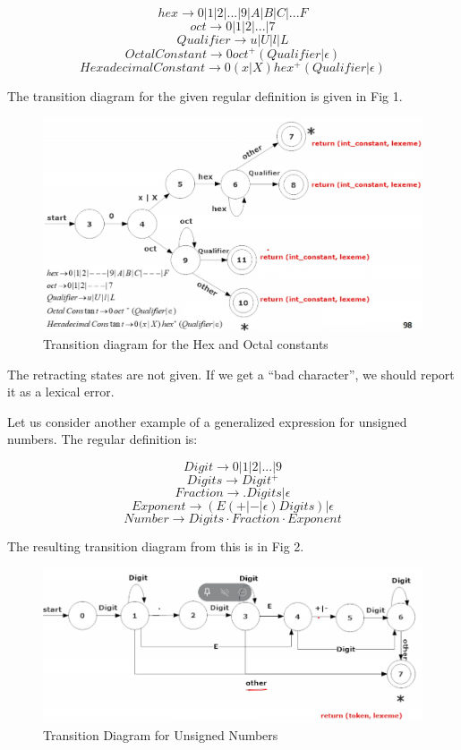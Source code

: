 \documentclass[12pt,letterpaper]{amsbook}
\theoremstyle{definition}
\begin{document}
\[hex \rightarrow 0|1|2|...|9|A|B|C|...F\]
\[oct \rightarrow 0|1|2|...|7\]
\[Qualifier \rightarrow u|U|l|L\]
\[OctalConstant\rightarrow 0 oct^+(Qualifier|\epsilon)\]
\[HexadecimalConstant\rightarrow 0(x|X)hex^+(Qualifier|\epsilon)\]

The transition diagram for the given regular definition is given in Fig 1.

\begin{figure}[htpb]
  \centering
  \includegraphics[width=0.8\linewidth]{./assets/hex_oct_trans_diag.png}
  \caption{Transition diagram for the Hex and Octal constants}%
  \label{fig:}
\end{figure}

The retracting states are not given. If we get a ``bad character'', we should report it as a lexical error.

Let us consider another example of a generalized expression for unsigned numbers. The regular definition is:

\[Digit \rightarrow 0|1|2|...|9\]
\[Digits \rightarrow Digit^+\]
\[Fraction \rightarrow .Digits|\epsilon\]
\[Exponent \rightarrow (E(+|-|\epsilon)Digits)|\epsilon\]
\[Number \rightarrow Digits \cdot Fraction \cdot Exponent\]

The resulting transition diagram from this is in Fig 2.

\begin{figure}[htpb]
  \centering
  \includegraphics[width=0.8\linewidth]{./assets/unsigned_num_trans_diag.png}
  \caption{Transition Diagram for Unsigned Numbers}%
  \label{fig:}
\end{figure}
\end{document}
